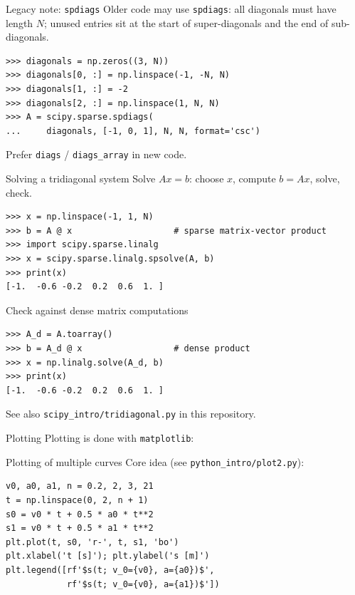 \begin{frame}[fragile]{Legacy note: \texttt{spdiags}}
  Older code may use \texttt{spdiags}: all diagonals must have length $N$;
  unused entries sit at the start of super-diagonals and the end of
  sub-diagonals.
\begin{lstlisting}[style=pythonTiny]
>>> diagonals = np.zeros((3, N))
>>> diagonals[0, :] = np.linspace(-1, -N, N)
>>> diagonals[1, :] = -2
>>> diagonals[2, :] = np.linspace(1, N, N)
>>> A = scipy.sparse.spdiags(
...     diagonals, [-1, 0, 1], N, N, format='csc')
\end{lstlisting}
  Prefer \texttt{diags} / \texttt{diags\_array} in new code.
\end{frame}

\begin{frame}[fragile]{Solving a tridiagonal system}
  Solve $Ax=b$: choose $x$, compute $b=Ax$, solve, check.
\begin{lstlisting}[style=pythonTiny]
>>> x = np.linspace(-1, 1, N)
>>> b = A @ x                    # sparse matrix-vector product
>>> import scipy.sparse.linalg
>>> x = scipy.sparse.linalg.spsolve(A, b)
>>> print(x)
[-1.  -0.6 -0.2  0.2  0.6  1. ]
\end{lstlisting}
\end{frame}

\begin{frame}[fragile]{Check against dense matrix computations}
\begin{lstlisting}[style=pythonTiny]
>>> A_d = A.toarray()
>>> b = A_d @ x                  # dense product
>>> x = np.linalg.solve(A_d, b)
>>> print(x)
[-1.  -0.6 -0.2  0.2  0.6  1. ]
\end{lstlisting}
  See also \texttt{scipy\_intro/tridiagonal.py} in this repository.
\end{frame}

\begin{frame}[fragile]{Plotting}
  Plotting is done with \texttt{matplotlib}:

\end{frame}

\begin{frame}[fragile]{Plotting of multiple curves}
  Core idea (see \texttt{python\_intro/plot2.py}):
\begin{lstlisting}[style=pythonTiny]
v0, a0, a1, n = 0.2, 2, 3, 21
t = np.linspace(0, 2, n + 1)
s0 = v0 * t + 0.5 * a0 * t**2
s1 = v0 * t + 0.5 * a1 * t**2
plt.plot(t, s0, 'r-', t, s1, 'bo')
plt.xlabel('t [s]'); plt.ylabel('s [m]')
plt.legend([rf'$s(t; v_0={v0}, a={a0})$',
            rf'$s(t; v_0={v0}, a={a1})$'])
\end{lstlisting}
\end{frame}
